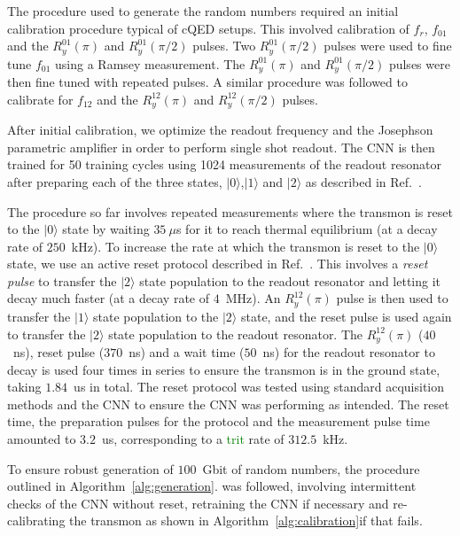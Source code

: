 \documentclass[11pt,a4paper]{article}
\begin{document}
The procedure used to generate the random numbers required an initial calibration procedure typical of cQED setups. This involved calibration of $f_r$, $f_{01}$ and the $R^{01}_y(\pi)$ and $R^{01}_y(\pi/2)$ pulses. Two $R^{01}_y(\pi/2)$ pulses were used to fine tune $f_{01}$ using a Ramsey measurement. The $R^{01}_y(\pi)$ and $R^{01}_y(\pi/2)$ pulses were then fine tuned with repeated pulses. A similar procedure was followed to calibrate for $f_{12}$ and the $R^{12}_y(\pi)$ and $R^{12}_y(\pi/2)$ pulses.

After initial calibration, we optimize the readout frequency and the Josephson parametric amplifier in order to perform single shot readout. The CNN is then trained for 50 training cycles using 1024 measurements of the readout resonator after preparing each of the three states, $|0\rangle$,$|1\rangle$ and $|2\rangle$ as described in Ref.~\cite{navarathnaNeuralNetworksOnthefly2021}.

The procedure so far involves repeated measurements where the transmon is reset to the $|0\rangle$ state by waiting $35~\mu$s for it to reach thermal equilibrium (at a decay rate of $250$~kHz). To increase the rate at which the transmon is reset to the $|0\rangle$ state, we use an active reset protocol described in Ref.~\cite{Jerger2015,Magnard2018}. This involves a \textit{reset pulse} to transfer the $|2\rangle$ state population to the readout resonator and letting it decay much faster (at a decay rate of $4$~MHz). An $R^{12}_y(\pi)$ pulse is then used to transfer the $|1\rangle$ state population to the $|2\rangle$ state, and the reset pulse is used again to transfer the $|2\rangle$ state population to the readout resonator. The $R^{12}_y(\pi)$ ($40$~ns), reset pulse ($370$~ns) and a wait time ($50$~ns) for the readout resonator to decay is used four times in series to ensure the transmon is in the ground state, taking $1.84$~us in total. The reset protocol was tested using standard acquisition methods and the CNN to ensure the CNN was performing as intended. The reset time, the preparation pulses for the protocol and the measurement pulse time amounted to $3.2$~us, corresponding to a \textcolor{green}{trit} rate of $312.5$~kHz.

To ensure robust generation of $100$~Gbit of random numbers, the procedure outlined in Algorithm~\ref{alg:generation}. was followed, involving intermittent checks of the CNN without reset, retraining the CNN if necessary and re-calibrating the transmon as shown in Algorithm~\ref{alg:calibration}if that fails.
\end{document}
